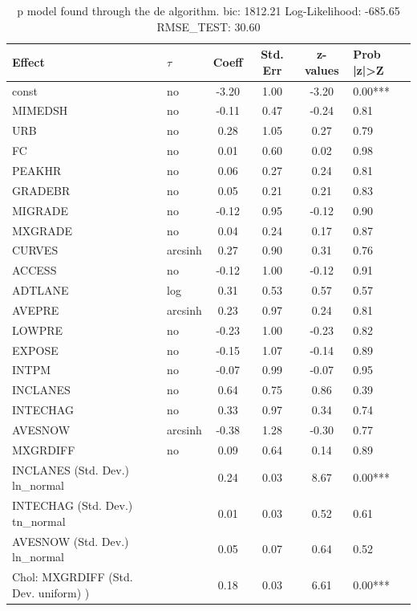 \begin{table}
	\caption{p model found through the de algorithm. bic: 1812.21 Log-Likelihood: -685.65 RMSE_TEST: 30.60}
	\begin{center}
		\begin{tabular}{|l|l|c|c|c|l|}
			\hline
			Effect & $\tau$ & Coeff & Std. Err & z-values & Prob |z|>Z \\
			\hline
			const & no & -3.20 & 1.00 & -3.20 & 0.00*** \\
			\hline
			MIMEDSH & no & -0.11 & 0.47 & -0.24 & 0.81 \\
			\hline
			URB & no & 0.28 & 1.05 & 0.27 & 0.79 \\
			\hline
			FC & no & 0.01 & 0.60 & 0.02 & 0.98 \\
			\hline
			PEAKHR & no & 0.06 & 0.27 & 0.24 & 0.81 \\
			\hline
			GRADEBR & no & 0.05 & 0.21 & 0.21 & 0.83 \\
			\hline
			MIGRADE & no & -0.12 & 0.95 & -0.12 & 0.90 \\
			\hline
			MXGRADE & no & 0.04 & 0.24 & 0.17 & 0.87 \\
			\hline
			CURVES & arcsinh & 0.27 & 0.90 & 0.31 & 0.76 \\
			\hline
			ACCESS & no & -0.12 & 1.00 & -0.12 & 0.91 \\
			\hline
			ADTLANE & log & 0.31 & 0.53 & 0.57 & 0.57 \\
			\hline
			AVEPRE & arcsinh & 0.23 & 0.97 & 0.24 & 0.81 \\
			\hline
			LOWPRE & no & -0.23 & 1.00 & -0.23 & 0.82 \\
			\hline
			EXPOSE & no & -0.15 & 1.07 & -0.14 & 0.89 \\
			\hline
			INTPM & no & -0.07 & 0.99 & -0.07 & 0.95 \\
			\hline
			INCLANES & no & 0.64 & 0.75 & 0.86 & 0.39 \\
			\hline
			INTECHAG & no & 0.33 & 0.97 & 0.34 & 0.74 \\
			\hline
			AVESNOW & arcsinh & -0.38 & 1.28 & -0.30 & 0.77 \\
			\hline
			MXGRDIFF & no & 0.09 & 0.64 & 0.14 & 0.89 \\
			\hline
			INCLANES (Std. Dev.) ln_normal &  & 0.24 & 0.03 & 8.67 & 0.00*** \\
			\hline
			INTECHAG (Std. Dev.) tn_normal &  & 0.01 & 0.03 & 0.52 & 0.61 \\
			\hline
			AVESNOW (Std. Dev.) ln_normal &  & 0.05 & 0.07 & 0.64 & 0.52 \\
			\hline
			 Chol: MXGRDIFF (Std. Dev. uniform) ) &  & 0.18 & 0.03 & 6.61 & 0.00*** \\
			\hline
		\end{tabular}
	\end{center}
\end{table}